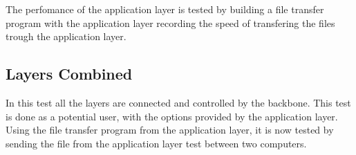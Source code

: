 The perfomance of the application layer is tested by building a file transfer program with the application layer recording the speed of transfering the files trough the application layer.

\subsection{Layers Combined}

In this test all the layers are connected and controlled by the backbone. This test is done as a potential user, with the options provided by the application layer. Using the file transfer program from the application layer, it is now tested by sending the file from the application layer test between two computers. 

